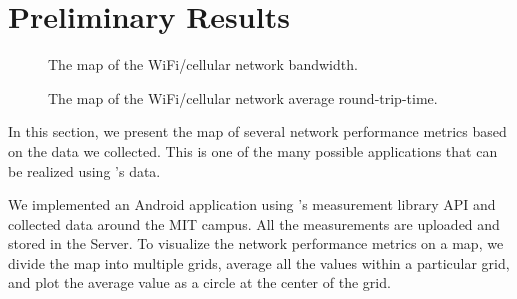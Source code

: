 \section{Preliminary Results}
\label{ss:results}

\begin{figure}[t]
  \caption{
    The map of the WiFi/cellular network bandwidth.
  }
  \label{fig:bw}
\end{figure}

\begin{figure}[t]
  \caption{
    The map of the WiFi/cellular network average round-trip-time.
  }
  \label{fig:rtt}
\end{figure}

In this section, we present the map of several network performance
metrics based on the data we collected. This is one of the many possible
applications that can be realized using \name{}'s data.

We implemented an Android application using \name{}'s measurement
library API and collected data around the MIT campus.
All the measurements are uploaded and stored in the \name{} Server.
To visualize the network performance metrics on a map, we divide the map
into multiple grids, average all the values within a particular grid, and
plot the average value as a circle at the center of the grid.

